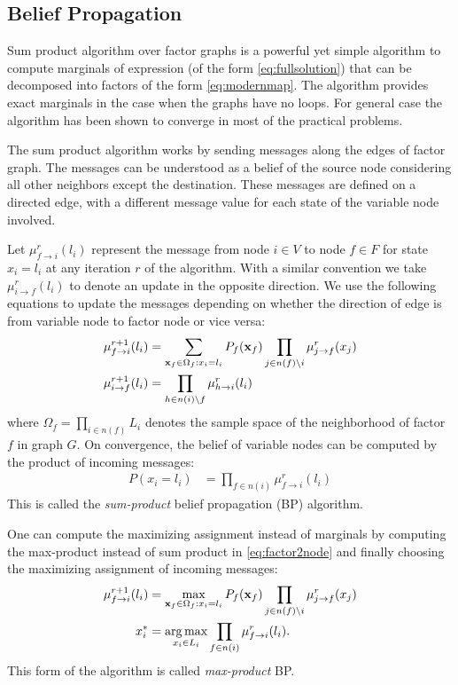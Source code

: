 \documentclass[letterpaper, 10 pt, conference]{ieeeconf} %
\DeclareMathOperator*{\argmax}{arg\,max}
\begin{document}
\subsection{Belief Propagation}
\newcommand{\bpmsg}[4]{\mu^{#4}_{#1\rightarrow#2}(#3)}
Sum product algorithm over factor graphs \cite{kschischang2001factor} is a
powerful yet simple algorithm to compute marginals of
expression (of the form \eqref{eq:fullsolution}) that can be decomposed into
factors of the form \eqref{eq:modernmap}. The algorithm provides exact
marginals in the case when the graphs have no loops. For general case the
algorithm has been shown %
to converge in most of the practical problems.
 
The sum product algorithm works by sending messages along the edges of factor
graph. The messages can be understood as a belief of the source node
considering all other neighbors except the destination. These messages are
defined on a directed edge, with a different message value for each state of
the variable node involved. 

Let $\bpmsg{f}{i}{l_i}{r}$ represent the message from
node $i \in V$ to node $f \in F$ for state $x_i = l_i$ at any iteration $r$ of the
algorithm. With a similar convention we take $\bpmsg{i}{f}{l_i}{r}$ to denote
an update in the opposite direction. We use the following equations to update 
the messages depending on whether the direction of edge is from variable node to factor node or vice versa:
\begin{align}
  \bpmsg{f}{i}{l_i}{r+1} &= \sum_{\map_f \in \Omega_f: x_i = l_i}P_f(\map_f)\prod_{j \in n(f) \setminus i}\bpmsg{j}{f}{x_j}{r}
  \label{eq:factor2node}
  \\
  \bpmsg{i}{f}{l_i}{r+1} &= \prod_{h \in n(i) \setminus f}\bpmsg{h}{i}{l_i}{r}
  \label{eq:node2factor}
\end{align}
where $\Omega_f = \prod_{i \in n(f)} L_i$ denotes the sample space of the
neighborhood of factor $f$ in graph $G$. On convergence, the belief of variable
nodes can be computed by the product of incoming messages:
\begin{align}
  P(x_i = l_i) &= \prod_{f \in n(i)}\bpmsg{f}{i}{l_i}{r}
\end{align}
This is called the \emph{sum-product} belief propagation (BP) algorithm.

One can compute the maximizing assignment instead of marginals by computing
the max-product instead of sum product in \eqref{eq:factor2node} and finally 
choosing the maximizing assignment of incoming messages:
\begin{align}
  \bpmsg{f}{i}{l_i}{r+1} &= \max_{\map_f \in \Omega_f: x_i =
l_i}P_f(\map_f)\prod_{j \in n(f) \setminus i}\bpmsg{j}{f}{x_j}{r}\\
x_i^* &= \argmax_{x_i \in L_i} \prod_{f \in n(i)}\bpmsg{f}{i}{l_i}{r}.
\end{align}
This form of the algorithm is called \emph{max-product} BP.
\end{document}
